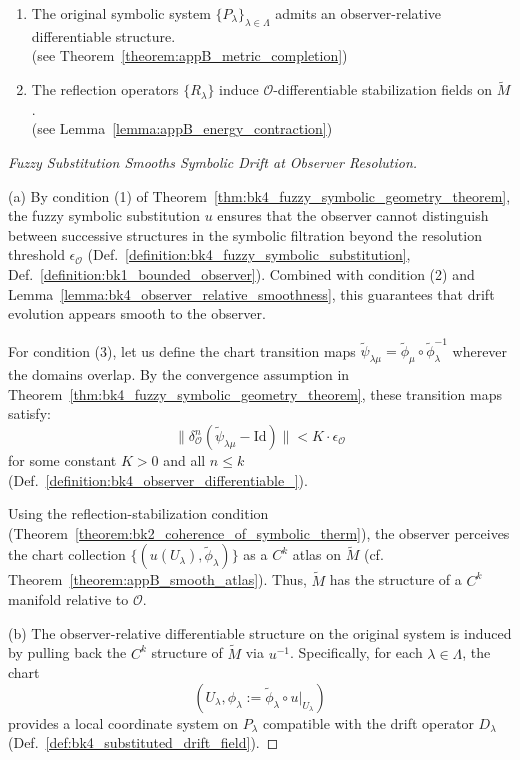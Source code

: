 \begin{theorem}
\begin{enumerate}
    \item The original symbolic system $\{P_\lambda\}_{\lambda \in \Lambda}$ admits an observer-relative differentiable structure.\\
    (see Theorem~\ref{theorem:appB_metric_completion})

    \item The reflection operators $\{R_\lambda\}$ induce $\mathcal{O}$-differentiable stabilization fields on $\tilde{M}$.\\
    (see Lemma~\ref{lemma:appB_energy_contraction})
\end{enumerate}
\end{theorem}

\begin{proof}[Fuzzy Substitution Smooths Symbolic Drift at Observer Resolution]
\label{proof:bk4_fuzzy_substitution_drift_smoothing}

(a) By condition (1) of Theorem~\ref{thm:bk4_fuzzy_symbolic_geometry_theorem}, the fuzzy symbolic substitution $u$ ensures that the observer cannot distinguish between successive structures in the symbolic filtration beyond the resolution threshold $\epsilon_\mathcal{O}$ (Def.~\ref{definition:bk4_fuzzy_symbolic_substitution}, Def.~\ref{definition:bk1_bounded_observer}). Combined with condition (2) and Lemma~\ref{lemma:bk4_observer_relative_smoothness}, this guarantees that drift evolution appears smooth to the observer.

For condition (3), let us define the chart transition maps $\tilde{\psi}_{\lambda\mu} = \tilde{\phi}_\mu \circ \tilde{\phi}_\lambda^{-1}$ wherever the domains overlap. By the convergence assumption in Theorem~\ref{thm:bk4_fuzzy_symbolic_geometry_theorem}, these transition maps satisfy:
\[
\|\delta^n_\mathcal{O}(\tilde{\psi}_{\lambda\mu} - \text{Id})\| < K \cdot \epsilon_\mathcal{O}
\]
for some constant $K > 0$ and all $n \leq k$ (Def.~\ref{definition:bk4_observer_differentiable_}).

Using the reflection-stabilization condition (Theorem~\ref{theorem:bk2_coherence_of_symbolic_therm}), the observer perceives the chart collection $\{(u(U_\lambda), \tilde{\phi}_\lambda)\}$ as a $C^k$ atlas on $\tilde{M}$ (cf. Theorem~\ref{theorem:appB_smooth_atlas}). Thus, $\tilde{M}$ has the structure of a $C^k$ manifold relative to $\mathcal{O}$.

(b) The observer-relative differentiable structure on the original system is induced by pulling back the $C^k$ structure of $\tilde{M}$ via $u^{-1}$. Specifically, for each $\lambda \in \Lambda$, the chart
\[
(U_\lambda, \phi_\lambda := \tilde{\phi}_\lambda \circ u|_{U_\lambda})
\]
provides a local coordinate system on $P_\lambda$ compatible with the drift operator $D_\lambda$ (Def.~\ref{def:bk4_substituted_drift_field}).


\end{proof}
